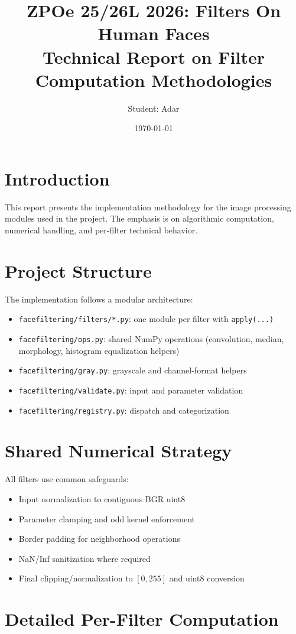 \documentclass[11pt,a4paper]{article}
\title{ZPOe 25/26L 2026: Filters On Human Faces\\\large Technical Report on Filter Computation Methodologies}
\author{Student: Adar}
\date{\today}
\begin{document}
\maketitle
\tableofcontents
\newpage

\section{Introduction}
This report presents the implementation methodology for the image processing modules used in the project. The emphasis is on algorithmic computation, numerical handling, and per-filter technical behavior.

\section{Project Structure}
The implementation follows a modular architecture:
\begin{itemize}[leftmargin=1.2cm]
  \item \texttt{facefiltering/filters/*.py}: one module per filter with \texttt{apply(...)}
  \item \texttt{facefiltering/ops.py}: shared NumPy operations (convolution, median, morphology, histogram equalization helpers)
  \item \texttt{facefiltering/gray.py}: grayscale and channel-format helpers
  \item \texttt{facefiltering/validate.py}: input and parameter validation
  \item \texttt{facefiltering/registry.py}: dispatch and categorization
\end{itemize}

\section{Shared Numerical Strategy}
All filters use common safeguards:
\begin{itemize}[leftmargin=1.2cm]
  \item Input normalization to contiguous BGR uint8
  \item Parameter clamping and odd kernel enforcement
  \item Border padding for neighborhood operations
  \item NaN/Inf sanitization where required
  \item Final clipping/normalization to \([0,255]\) and uint8 conversion
\end{itemize}

\section{Detailed Per-Filter Computation}
\end{document}
